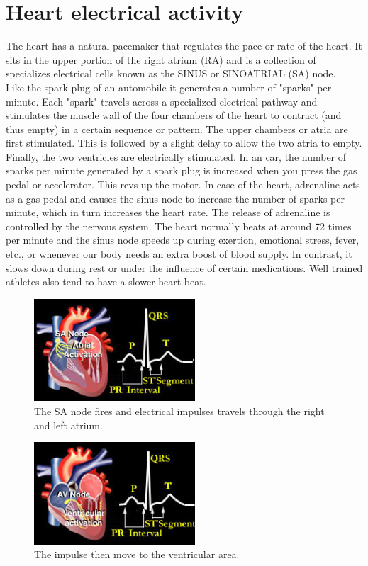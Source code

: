 \section{Heart electrical activity}
The heart has a natural pacemaker that regulates the pace or rate of the heart. It sits in the upper portion of the right atrium (RA) and is a collection of specializes electrical cells known as the SINUS or SINOATRIAL (SA) node.\\
Like the spark-plug of an automobile it generates a number of "sparks" per minute. Each "spark" travels across a specialized electrical pathway and stimulates the muscle wall of the four chambers of the heart to contract (and thus empty) in a certain sequence or pattern. The upper chambers or atria are first stimulated. This is followed by a slight delay to allow the two atria to empty. Finally, the two ventricles are electrically stimulated. In an car, the number of sparks per minute generated by a spark plug is increased when you press the gas pedal or accelerator. This revs up the motor. In case of the heart, adrenaline acts as a gas pedal and causes the sinus node to increase the number of sparks per minute, which in turn increases the heart rate. The release of adrenaline is controlled by the nervous system. The heart normally beats at around 72 times per minute and the sinus node speeds up during exertion, emotional stress, fever, etc., or whenever our body needs an extra boost of blood supply. In contrast, it slows down during rest or under the influence of certain medications. Well trained athletes also tend to have a slower heart beat.\\

\begin{figure}[ht!]
	\centering
	\includegraphics[width=60mm]{figures/ch2/3.png}
	\caption{The SA node fires and electrical impulses travels through the right and left atrium. \label{overflow}}
	\label{fig2.3}
\end{figure}
\begin{figure}[ht!]
	\centering
	\includegraphics[width=60mm]{figures/ch2/4.png}
	\caption{The impulse then move to the ventricular area.}
	\label{fig2.4}
\end{figure}

